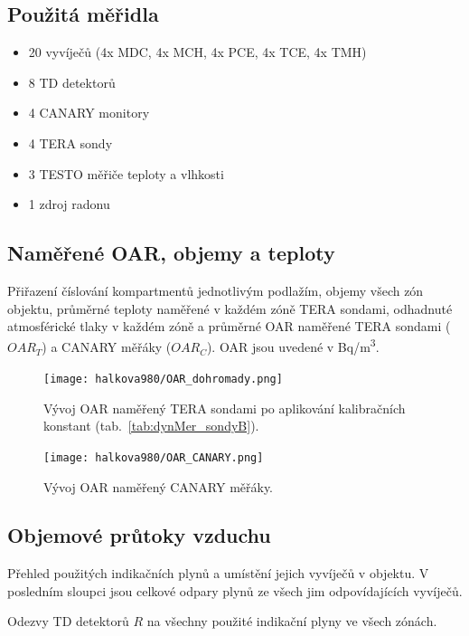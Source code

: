\subsection{Použitá měřidla}
\begin{itemize}
    \setlength\itemsep{0em}
	\item 20 vyvíječů (4x MDC, 4x MCH, 4x PCE, 4x TCE, 4x TMH)
	\item 8 TD detektorů
	\item 4 CANARY monitory
	\item 4 TERA sondy
	\item 3 TESTO měřiče teploty a vlhkosti
	\item 1 zdroj radonu
\end{itemize}

\subsection{Naměřené OAR, objemy a teploty}

\begin{table}[H]
    \centering
    \caption{Přiřazení číslování kompartmentů jednotlivým podlažím, objemy všech zón objektu, průměrné teploty naměřené v každém zóně TERA sondami, odhadnuté atmosférické tlaky v každém zóně a průměrné OAR naměřené TERA sondami ($OAR_T$) a CANARY měřáky ($OAR_C$). OAR jsou uvedené v \si{Bq/m^3}.}
    \label{tab:halkova980_objemy}
    
\end{table}
\begin{figure}[H]
    \centering
    \texttt{[image: halkova980/OAR\_dohromady.png]}
    \caption{Vývoj OAR naměřený TERA sondami po aplikování kalibračních konstant (tab.~\ref{tab:dynMer_sondyB}).}
    \label{fig:halkova980_OAR_dohromady}
\end{figure}
\begin{figure}[H]
    \centering
    \texttt{[image: halkova980/OAR\_CANARY.png]}
    \caption{Vývoj OAR naměřený CANARY měřáky.}
    \label{fig:halkova980_OAR_CANARY}
\end{figure}

\subsection{Objemové průtoky vzduchu}

\begin{table}[H]
    \centering
    \caption{Přehled použitých indikačních plynů a umístění jejich vyvíječů v objektu. V posledním sloupci jsou celkové odpary plynů ze všech jim odpovídajících vyvíječů.}
    \label{tab:halkova980_indikacniPlyny}
    
\end{table}
\begin{table}[H]
    \centering
    \caption{Odezvy TD detektorů $R$ na všechny použité indikační plyny ve všech zónách.}
    \label{tab:halkova980_odezvyTD}
    
\end{table}

